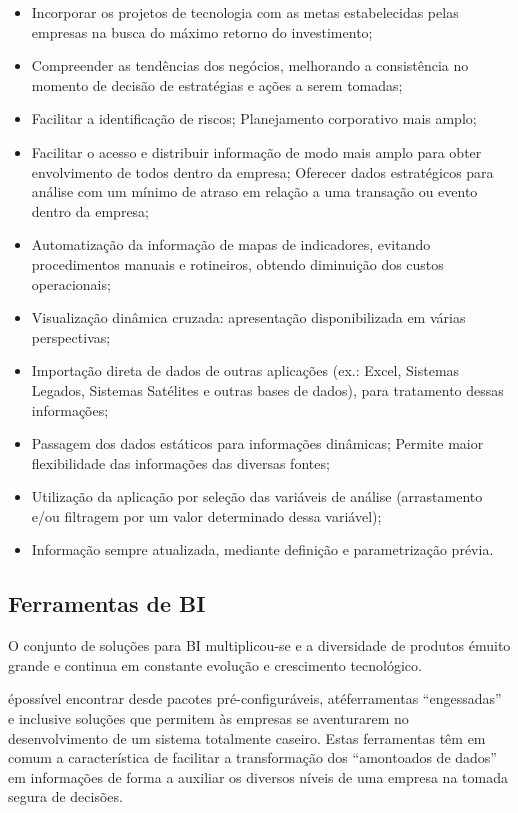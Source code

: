 \begin{itemize}

    \item Incorporar os projetos de tecnologia com as metas estabelecidas pelas empresas na busca do máximo retorno do investimento;
    \item Compreender as tendências dos negócios, melhorando a consistência no momento de decisão de estratégias e ações a serem tomadas;
    \item Facilitar a identificação de riscos;
    Planejamento corporativo mais amplo;
    \item Facilitar o acesso e distribuir informação de modo mais amplo para obter envolvimento de todos dentro da empresa;
    Oferecer dados estratégicos para análise com um mínimo de atraso em relação a uma transação ou evento dentro da empresa;
    \item Automatização da informação de mapas de indicadores, evitando procedimentos manuais e rotineiros, obtendo diminuição dos custos operacionais;
    \item Visualização dinâmica cruzada: apresentação disponibilizada em várias perspectivas;
    \item Importação direta de dados de outras aplicações (ex.: Excel, Sistemas Legados, Sistemas Satélites e outras bases de dados), para tratamento dessas informações;
    \item Passagem dos dados estáticos para informações dinâmicas;
    Permite maior flexibilidade das informações das diversas fontes;
    \item Utilização da aplicação por seleção das variáveis de análise (arrastamento e/ou filtragem por um valor determinado dessa variável);
    \item Informação sempre atualizada, mediante definição e parametrização prévia.
 
 \end{itemize}
 
\subsection{Ferramentas de BI}

O conjunto de soluções para BI multiplicou-se e a diversidade de produtos \'{e}muito grande e continua em constante evolução e crescimento tecnológico.

\'{e}possível encontrar desde pacotes pré-configuráveis, at\'{e}ferramentas “engessadas” e inclusive soluções que permitem às empresas se aventurarem no desenvolvimento de um sistema totalmente caseiro.
Estas ferramentas têm em comum a característica de facilitar a transformação dos “amontoados de dados” em informações de forma a auxiliar os diversos níveis de uma empresa na tomada segura de decisões.

